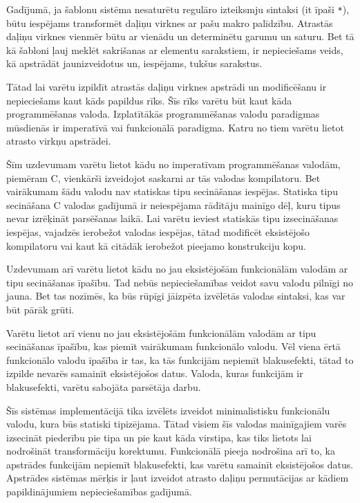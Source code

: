 Gadījumā, ja šablonu sistēma nesaturētu regulāro izteiksmju sintaksi (it īpaši \verb|*|), būtu iespējams transformēt daļiņu virknes ar pašu makro palīdzību. Atrastās daļiņu virknes vienmēr būtu ar vienādu un determinētu garumu un saturu. Bet tā kā šabloni ļauj meklēt sakrišanas ar elementu sarakstiem, ir nepieciešams veids, kā apstrādāt jaunizveidotus un, iespējams, tukšus sarakstus.

Tātad lai varētu izpildīt atrastās daļiņu virknes apstrādi un modificēšanu ir nepieciešams kaut kāds papildus rīks. Šīs rīks varētu būt kaut kāda programmēšanas valoda. Izplatītākās programmēšanas valodu paradigmas mūsdienās ir imperatīvā  vai funkcionālā paradigma. Katru no tiem varētu lietot atrasto virkņu apstrādei.

Šīm uzdevumam varētu lietot kādu no imperatīvam programmēšanas valodām, piemēram C, vienkārši izveidojot saskarni ar tās valodas kompilatoru. Bet vairākumam šādu valodu nav statiskas tipu secināšanas iespējas. Statiska tipu secināšana C valodas gadījumā ir neiespējama rādītāju mainīgo dēļ, kuru tipus nevar izrēķināt parsēšanas laikā. Lai varētu ieviest statiskās tipu izsecināšanas iespējas, vajadzēs ierobežot valodas iespējas, tātad modificēt eksistējošo kompilatoru vai kaut kā citādāk ierobežot pieejamo konstrukciju kopu.

Uzdevumam arī varētu lietot kādu no jau eksistējošām funkcionālām valodām ar tipu secināšanas īpašību. Tad nebūs nepieciešamības veidot savu valodu pilnīgi no jauna. Bet tas nozīmēs, ka būs rūpīgi jāizpēta izvēlētās valodas sintaksi, kas var būt pārāk grūti.

Varētu lietot arī vienu no jau eksistējošām funkcionālām valodām ar tipu secināšanas īpašību, kas piemīt vairākumam funkcionālo valodu. Vēl viena ērtā funkcionālo valodu īpašība ir tas, ka tās funkcijām nepiemīt blakusefekti, tātad to izpilde nevarēs samainīt eksistējošos datus. Valoda, kuras funkcijām ir blakusefekti, varētu sabojāta parsētāja darbu.

Šīs sistēmas implementācijā tika izvēlēts izveidot minimalistisku funkcionālu valodu, kura būs statiski tipizējama. Tātad visiem šīs valodas mainīgajiem varēs izsecināt piederību pie tipa un pie kaut kāda virstipa, kas tiks lietots lai nodrošināt transformāciju korektumu. Funkcionālā pieeja nodrošina arī to, ka apstrādes funkcijām nepiemīt blakusefekti, kas varētu samainīt eksistējošos datus. Apstrādes sistēmas mērķis ir ļaut izveidot atrasto daļiņu permutācijas ar kādiem papildinājumiem nepieciešamības gadījumā.

